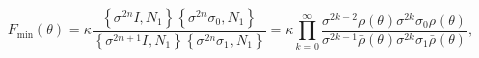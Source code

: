 \begin{equation}
F_{\text{min}}\left( \theta \right) =\kappa \frac{\left\{ \sigma
^{2n}I,N_{1}\right\} \left\{ \sigma ^{2n}\sigma _{0},N_{1}\right\} }{\left\{
\sigma ^{2n+1}I,N_{1}\right\} \left\{ \sigma ^{2n}\sigma _{1},N_{1}\right\} }%
=\kappa \prod\limits_{k=0}^{\infty }\frac{\sigma ^{2k-2}\rho \left( \theta
\right) \sigma ^{2k}\sigma _{0}\rho \left( \theta \right) }{\sigma ^{2k-1}%
\bar{\rho}\left( \theta \right) \sigma ^{2k}\sigma _{1}\bar{\rho}\left(
\theta \right) },
\end{equation}%
